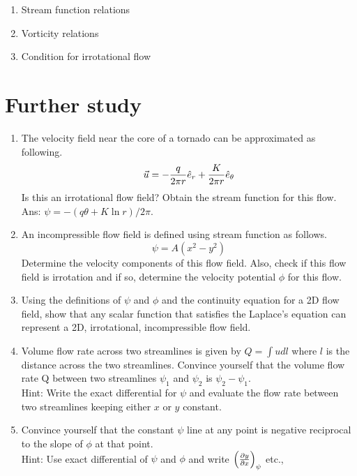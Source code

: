 \begin{enumerate}
\item Stream function relations
\item Vorticity relations
\item Condition for irrotational flow
\end{enumerate}


\section{Further study}

\begin{enumerate}
\item The velocity field near the core of a tornado can be approximated as following.
$$ \vec{u} = -{q \over 2 \pi r} \hat{e}_r + {K \over 2 \pi r} \hat{e}_\theta $$
Is this an irrotational flow field? Obtain the stream function for this flow. \\ Ans: $\psi = -\left( q\theta+K\ln r \right)/2\pi$.

\item An incompressible flow field is defined using stream function as follows. $$ \psi = A\left(x^2-y^2\right)$$
Determine the velocity components of this flow field. Also, check if this flow field is irrotation and if so, determine the velocity potential $\phi$ for this flow.

\item Using the definitions of $\psi$ and $\phi$ and the continuity equation for a 2D flow field, show that any scalar function that satisfies the Laplace's equation can represent a 2D, irrotational, incompressible flow field.

\item Volume flow rate across two streamlines is given by $Q=\int{u dl}$ where $l$ is the distance across the two streamlines. Convince yourself that the volume flow rate Q between two streamlines $\psi_1$ and $\psi_2$ is $\psi_2-\psi_1$. \\ Hint: Write the exact differential for $\psi$ and evaluate the flow rate between two streamlines keeping either $x$ or $y$ constant.

\item Convince yourself that the constant $\psi$ line at any point is negative reciprocal to the slope of $\phi$ at that point.\\ Hint: Use exact differential of $\psi$ and $\phi$ and write $ \left( {\partial y \over \partial x} \right)_\psi$ etc.,


\end{enumerate}
